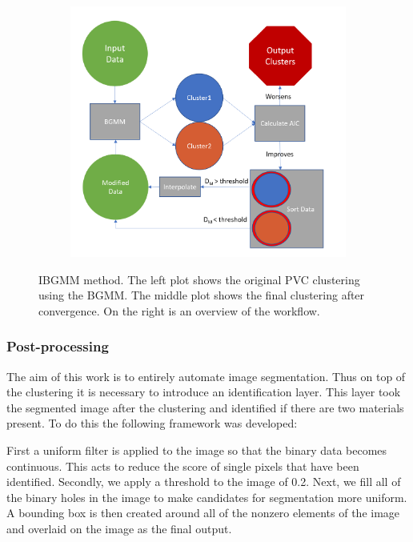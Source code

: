 \documentclass[a4paper,11pt]{article}
\begin{document}
\begin{figure}[htbp]
\begin{subfigure}[b]{0.32\textwidth}
        \includegraphics[width=\textwidth]{figures/algo_flow.png}
    \end{subfigure}
    \caption{IBGMM method. The left plot shows the original PVC clustering using the BGMM. The middle plot shows the final clustering after convergence. On the right is an overview of the workflow.}
    \label{iterative_method}
\end{figure}

\subsubsection{Post-processing}

The aim of this work is to entirely automate image segmentation. Thus on top of the clustering it is necessary to introduce an identification layer. This layer took the segmented image after the clustering and identified if there are two materials present. To do this the following framework was developed:

First a uniform filter is applied to the image so that the binary data becomes continuous. This acts to reduce the score of single pixels that have been identified. Secondly, we apply a threshold to the image of 0.2. Next, we fill all of the binary holes in the image to make candidates for segmentation more uniform. A bounding box is then created around all of the nonzero elements of the image and overlaid on the image as the final output.
\end{document}
